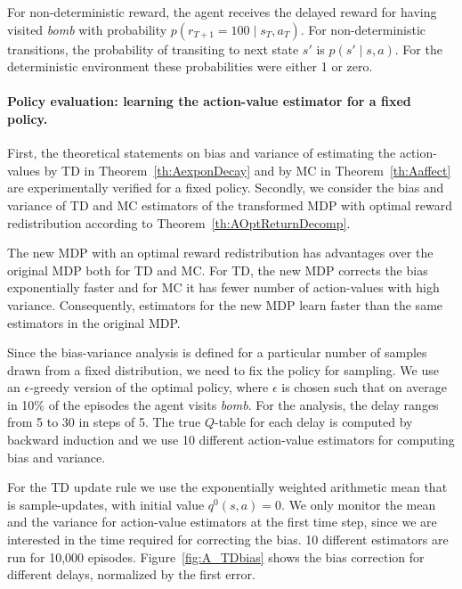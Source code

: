 \documentclass{article}
\begin{document}
\begin{appendices}
For non-deterministic reward, the agent receives the delayed reward for
having visited {\em bomb} with probability $p(r_{T+1}=100 \mid s_T,a_T)$. 
For non-deterministic transitions, the probability of transiting to next state $s'$ 
is $p(s'  \mid s,a)$. 
For the deterministic environment these probabilities were either 1 or zero. 


\paragraph{Policy evaluation: learning the action-value estimator for a fixed policy.} 
First, the theoretical statements on bias and variance of 
estimating the action-values by TD in Theorem~\ref{th:AexponDecay} and 
by MC in Theorem~\ref{th:Aaffect} are experimentally verified for a fixed policy.
Secondly, we consider the bias and variance of TD and MC estimators 
of the transformed MDP with optimal reward redistribution according to Theorem~\ref{th:AOptReturnDecomp}.

The new MDP with an optimal reward redistribution has advantages over
the original MDP both for TD and MC. For TD, the new MDP corrects the bias exponentially faster and 
for MC it has fewer number of action-values with high variance. 
Consequently, estimators for the new MDP learn faster 
than the same estimators in the original MDP.

Since the bias-variance analysis is defined for a particular number of samples 
drawn from a fixed distribution, we need to fix the policy for sampling. 
We use an $\epsilon$-greedy version of the optimal policy, where
$\epsilon$ is chosen such that on average in 10\% of the episodes the agent 
visits {\em bomb}. For the analysis, the delay ranges from 5 to 30 in steps of 5.
The true $Q$-table for each delay is computed 
by backward induction and we use 10 different action-value estimators 
for computing bias and variance.

For the TD update rule we use the exponentially weighted arithmetic mean that is sample-updates,
with initial value $q^0(s,a)=0$.
We only monitor the mean and the variance for action-value 
estimators at the first time step, 
since we are interested in the time required for correcting the bias.  
10 different estimators are run for 10,000 episodes. Figure~\ref{fig:A_TDbias} shows the bias correction for different delays, normalized by the first error.



\end{appendices}
\end{document}
